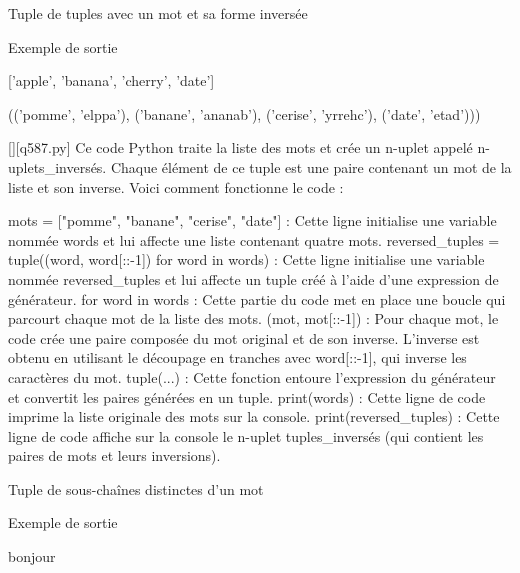         \question
        Tuple de tuples avec un mot et sa forme inversée

Exemple de sortie

['apple', 'banana', 'cherry', 'date']

(('pomme', 'elppa'), ('banane', 'ananab'), ('cerise', 'yrrehc'), ('date', 'etad')))
        \par
        \begin{solution}
            \renewcommand{\nomfichier}{q587.py}
            \pythonfile{\chemincode \nomfichier}[][\nomfichier]
            Ce code Python traite la liste des mots et crée un n-uplet appelé n-uplets\_inversés. Chaque élément de ce tuple est une paire contenant un mot de la liste et son inverse. Voici comment fonctionne le code :

    mots = ["pomme", "banane", "cerise", "date"] : Cette ligne initialise une variable nommée words et lui affecte une liste contenant quatre mots.
    reversed\_tuples = tuple((word, word[::-1]) for word in words) : Cette ligne initialise une variable nommée reversed\_tuples et lui affecte un tuple créé à l'aide d'une expression de générateur.
        for word in words : Cette partie du code met en place une boucle qui parcourt chaque mot de la liste des mots.
        (mot, mot[::-1]) : Pour chaque mot, le code crée une paire composée du mot original et de son inverse. L'inverse est obtenu en utilisant le découpage en tranches avec word[::-1], qui inverse les caractères du mot.
        tuple(...) : Cette fonction entoure l'expression du générateur et convertit les paires générées en un tuple.
    print(words) : Cette ligne de code imprime la liste originale des mots sur la console.
    print(reversed\_tuples) : Cette ligne de code affiche sur la console le n-uplet tuples\_inversés (qui contient les paires de mots et leurs inversions).
        \end{solution}
        

        \question
        Tuple de sous-chaînes distinctes d'un mot

Exemple de sortie

bonjour

